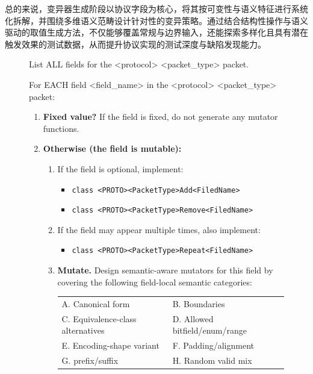 总的来说，变异器生成阶段以协议字段为核心，将其按可变性与语义特征进行系统化拆解，并围绕多维语义范畴设计针对性的变异策略。通过结合结构性操作与语义驱动的取值生成方法，不仅能够覆盖常规与边界输入，还能探索多样化且具有潜在触发效果的测试数据，从而提升协议实现的测试深度与缺陷发现能力。

\begin{figure}[H]
\centering
\begin{tcolorbox}[
  before upper=\linespread{1.2}\selectfont
]
 List ALL fields for the <protocol> <packet\_type> packet.

For EACH field <field\_name> in the <protocol> <packet\_type> packet:
\begin{enumerate}[noitemsep,leftmargin=*]
    \item \textbf{Fixed value?} If the field is fixed, do not generate any mutator functions.

    \item \textbf{Otherwise (the field is mutable):}
    \begin{enumerate}[noitemsep]
        \item If the field is optional, implement:
        \begin{itemize}[noitemsep,label={},leftmargin=*]
            \item \texttt{class <PROTO><PacketType>Add<FiledName>}
            \item \texttt{class <PROTO><PacketType>Remove<FiledName>}
        \end{itemize}

        \item If the field may appear multiple times, also implement:
        \begin{itemize}[noitemsep,label={},leftmargin=*]
            \item \texttt{class <PROTO><PacketType>Repeat<FiledName>}
        \end{itemize}

        \item \textbf{Mutate.} Design semantic-aware mutators for this field by covering the following field-local semantic categories:
        
            \begin{tabular}{ll}
A. Canonical form & B. Boundaries \\ 
C. Equivalence-class alternatives &
D. Allowed bitfield/enum/range \\ 
E. Encoding-shape variant & F. Padding/alignment \\
G. prefix/suffix & H. Random valid mix \\
\end{tabular}


\end{enumerate}
\end{enumerate}
\end{tcolorbox}
\end{figure}
